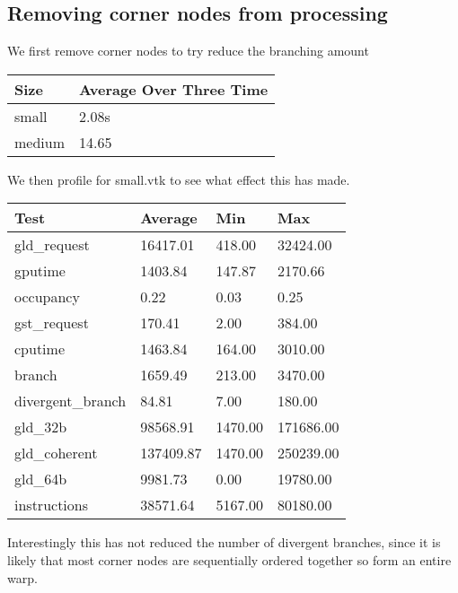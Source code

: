\subsection*{Removing corner nodes from processing}
We first remove corner nodes to try reduce the branching amount\\
\begin{tabular}{ l | l }
  \hline
  Size & Average Over Three Time \\
  \hline
  \hline
  small & 2.08s \\
  medium & 14.65 \\
  \hline
\end{tabular}

We then profile for small.vtk to see what effect this has made.\\
\begin{tabular}{ l | l | l | l}
\hline
Test & Average & Min & Max \\
\hline
\hline
gld\_request & 16417.01 & 418.00 & 32424.00 \\
gputime & 1403.84 & 147.87 & 2170.66 \\
occupancy & 0.22 & 0.03 & 0.25 \\
gst\_request & 170.41 & 2.00 & 384.00 \\
cputime & 1463.84 & 164.00 & 3010.00 \\
branch & 1659.49 & 213.00 & 3470.00 \\
divergent\_branch & 84.81 & 7.00 & 180.00 \\
gld\_32b & 98568.91 & 1470.00 & 171686.00 \\
gld\_coherent & 137409.87 & 1470.00 & 250239.00 \\
gld\_64b & 9981.73 & 0.00 & 19780.00 \\
instructions & 38571.64 & 5167.00 & 80180.00 \\
\hline
\end{tabular}

Interestingly this has not reduced the number of divergent branches, since it is likely that most corner nodes are sequentially ordered together so form an entire warp.